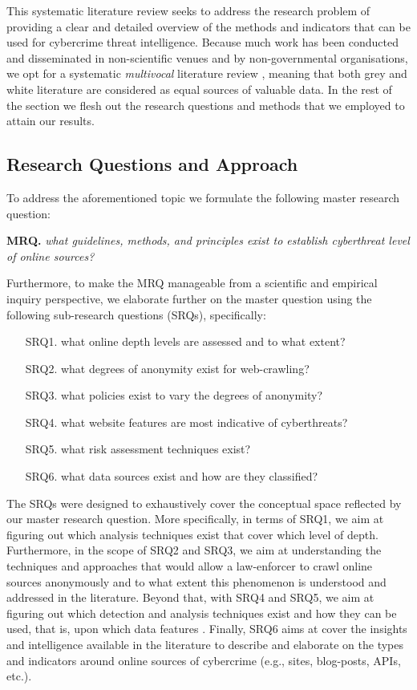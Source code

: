 This systematic literature review seeks to address the research problem of providing a clear and detailed overview of the methods and indicators that can be used for cybercrime threat intelligence. Because much work has been conducted and disseminated in non-scientific venues and by non-governmental organisations, we opt for a systematic \emph{multivocal} literature review \cite{mv}, meaning that both grey and white literature are considered as equal sources of valuable data. In the rest of the section we flesh out the research questions and methods that we employed to attain our results.

\subsection{Research Questions and Approach}

To address the aforementioned topic we formulate the following master research question:
\begin{center}
    \textbf{MRQ.} \emph{what guidelines, methods, and principles exist to establish cyberthreat level of online sources?}
\end{center}

Furthermore, to make the MRQ manageable from a scientific and empirical inquiry perspective, we elaborate further on the master question using the following sub-research questions (SRQs), specifically:
\begin{enumerate}
\item [SRQ1.] what online depth levels are assessed and to what extent?
\item [SRQ2.] what degrees of anonymity exist for web-crawling?
\item [SRQ3.] what policies exist to vary the degrees of anonymity?
\item [SRQ4.] what website features are most indicative of cyberthreats?
\item [SRQ5.] what risk assessment techniques exist?
\item [SRQ6.] what data sources exist and how are they classified?
\end{enumerate}

The SRQs were designed to exhaustively cover the conceptual space reflected by our master research question. More specifically, in terms of SRQ1, we aim at figuring out which analysis techniques exist that cover which level of depth. Furthermore, in the scope of SRQ2 and SRQ3, we aim at understanding the techniques and approaches that would allow a law-enforcer to crawl online sources anonymously and to what extent this phenomenon is understood and addressed in the literature. Beyond that, with SRQ4 and SRQ5, we aim at figuring out which detection and analysis techniques exist and how they can be used, that is, upon which data features \cite{Zave03}. Finally, SRQ6 aims at cover the insights and intelligence available in the literature to describe and elaborate on the types and indicators around online sources of cybercrime (e.g., sites, blog-posts, APIs, etc.).

